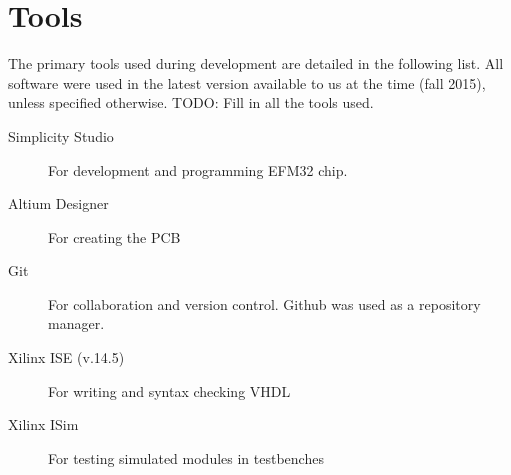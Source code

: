 \chapter{Tools}
The primary tools used during development are detailed in the following list. All software were used in the latest version available to us at the time (fall 2015), unless specified otherwise.
TODO: Fill in all the tools used.

\begin{description}
    \item[Simplicity Studio] For development and programming EFM32 chip.
    \item[Altium Designer] For creating the PCB
    \item[Git] For collaboration and version control. Github was used as a repository manager.
    \item[Xilinx ISE (v.14.5)] For writing and syntax checking VHDL
    \item[Xilinx ISim] For testing simulated modules in testbenches
\end{description}

